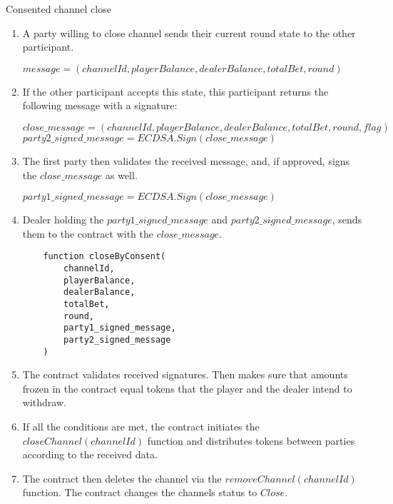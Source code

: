 \begin{algorithm}
\caption{Consented channel close} \label{alg:close1}
\begin{enumerate}
	\item A party willing to close channel sends their current round state to the other participant.
\begin{center}
$message = (channelId, playerBalance, dealerBalance, totalBet, round)$
\end{center} 
	\item If the other participant accepts this state, this participant returns the following message with a signature:
\begin{center}
$close\_message = (channelId, playerBalance, dealerBalance, totalBet, round, flag)$\\
$party2\_signed\_message = ECDSA.Sign(close\_message)$
\end{center}
	\item The first party then validates the received message, and, if approved, signs the $close\_message$ as well.
\begin{center}
$party1\_signed\_message = ECDSA.Sign(close\_message)$
\end{center}
	\item Dealer holding the $party1\_signed\_message$ and $party2\_signed\_message$, sends them to the contract with the $close\_message$. \label{deal_sig}
\begin{lstlisting}
    function closeByConsent(
        channelId,
        playerBalance,
        dealerBalance,
        totalBet,
        round,
        party1_signed_message,
        party2_signed_message 
    )
\end{lstlisting}
	\item The contract validates received signatures. Then makes sure that amounts frozen in the contract equal tokens that the player and the dealer intend to withdraw.
\end{enumerate}
\end{algorithm}

\begin{algorithm}
\begin{enumerate}
\setcounter{enumi}{5}
	\item If all the conditions are met, the contract initiates the $closeChannel(channelId)$ function and distributes tokens between parties according to the received data.
	\item The contract then deletes the channel via the $removeChannel(channelId)$ function. The contract changes the channels status to $Close$.
\end{enumerate}
\end{algorithm}

